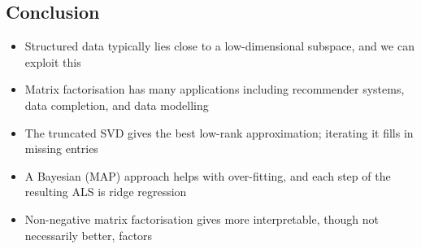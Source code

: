 \begin{slide}
\section{Conclusion}

\begin{PauseHighLight}
  \begin{itemize}
  \item Structured data typically lies close to a low-dimensional
    subspace, and we can exploit this\pause
  \item Matrix factorisation has many applications including recommender
    systems, data completion, and data modelling\pause
  \item The truncated SVD gives the best low-rank approximation;
    iterating it fills in missing entries\pause
  \item A Bayesian (MAP) approach helps with over-fitting, and each step
    of the resulting ALS is ridge regression\pause
  \item Non-negative matrix factorisation gives more interpretable,
    though not necessarily better, factors\pause
  \end{itemize}
\end{PauseHighLight}


\end{slide}




